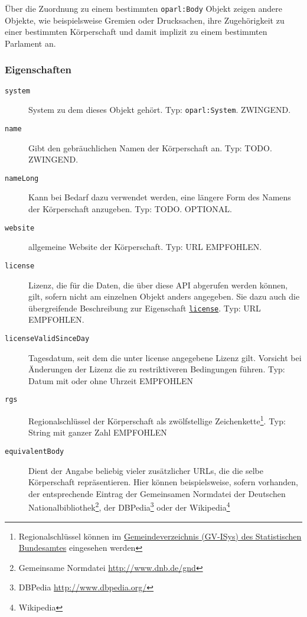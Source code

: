 \documentclass[,a4paper]{article}
\begin{document}
Über die Zuordnung zu einem bestimmten \texttt{oparl:Body} Objekt zeigen
andere Objekte, wie beispielsweise Gremien oder Drucksachen, ihre
Zugehörigkeit zu einer bestimmten Körperschaft und damit implizit zu
einem bestimmten Parlament an.

\subsubsection{Eigenschaften}\label{eigenschaften-1}

\begin{description}
\item[\texttt{system}]
System zu dem dieses Objekt gehört. Typ: \texttt{oparl:System}.
ZWINGEND.
\item[\texttt{name}]
Gibt den gebräuchlichen Namen der Körperschaft an. Typ: TODO. ZWINGEND.
\item[\texttt{nameLong}]
Kann bei Bedarf dazu verwendet werden, eine längere Form des Namens der
Körperschaft anzugeben. Typ: TODO. OPTIONAL.
\item[\texttt{website}]
allgemeine Website der Körperschaft. Typ: URL EMPFOHLEN.
\item[\texttt{license}]
Lizenz, die für die Daten, die über diese API abgerufen werden können,
gilt, sofern nicht am einzelnen Objekt anders angegeben. Sie dazu auch
die übergreifende Beschreibung zur Eigenschaft
\hyperref[eigenschaftux5flicense]{\texttt{license}}. Typ: URL EMPFOHLEN.
\item[\texttt{licenseValidSinceDay}]
Tagesdatum, seit dem die unter license angegebene Lizenz gilt. Vorsicht
bei Änderungen der Lizenz die zu restriktiveren Bedingungen führen. Typ:
Datum mit oder ohne Uhrzeit EMPFOHLEN
\item[\texttt{rgs}]
Regionalschlüssel der Körperschaft als zwölfstellige
Zeichenkette\footnote{Regionalschlüssel können im
  \href{https://www.destatis.de/DE/ZahlenFakten/LaenderRegionen/Regionales/Gemeindeverzeichnis/Gemeindeverzeichnis.html}{Gemeindeverzeichnis
  (GV-ISys) des Statistischen Bundesamtes} eingesehen werden}. Typ:
String mit ganzer Zahl EMPFOHLEN
\item[\texttt{equivalentBody}]
Dient der Angabe beliebig vieler zusätzlicher URLs, die die selbe
Körperschaft repräsentieren. Hier können beispielsweise, sofern
vorhanden, der entsprechende Eintrag der Gemeinsamen Normdatei der
Deutschen Nationalbibliothek\footnote{Gemeinsame Normdatei
  \url{http://www.dnb.de/gnd}}, der DBPedia\footnote{DBPedia
  \url{http://www.dbpedia.org/}} oder der Wikipedia\footnote{Wikipedia
}
\end{description}
\end{document}
